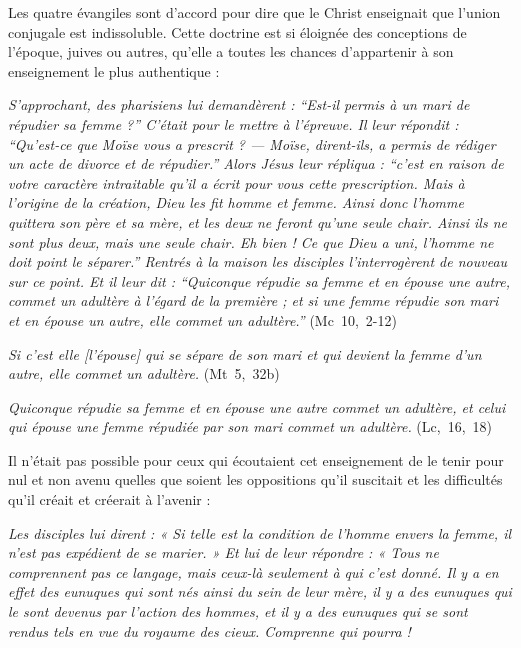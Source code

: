 Les quatre évangiles sont d'accord pour dire que le Christ enseignait que l'union conjugale est indissoluble. Cette doctrine est si éloignée des conceptions de l'époque, juives ou autres, qu'elle a toutes les chances d'appartenir à son enseignement le plus authentique :

\begin{displayquote}
\emph{S'approchant, des pharisiens lui demandèrent : \enquote{Est-il permis à un mari de répudier sa femme ?} C'était pour le mettre à l'épreuve. Il leur répondit : \enquote{Qu'est-ce que Moïse vous a prescrit ? --- Moïse, dirent-ils, a permis de rédiger un acte de divorce et de répudier.} Alors Jésus leur répliqua : \enquote{c'est en raison de votre caractère intraitable qu'il a écrit pour vous cette prescription. Mais à l'origine de la création, Dieu les fit homme et femme. Ainsi donc l'homme quittera son père et sa mère, et les deux ne feront qu'une seule chair. Ainsi ils ne sont plus deux, mais une seule chair. Eh bien ! Ce que Dieu a uni, l'homme ne doit point le séparer.} Rentrés à la maison les disciples l'interrogèrent de nouveau sur ce point. Et il leur dit : \enquote{Quiconque répudie sa femme et en épouse une autre, commet un adultère à l'égard de la première ; et si une femme répudie son mari et en épouse un autre, elle commet un adultère.}} (Mc~10,~2-12)

{\emph{Si c'est elle \emph{[l'épouse]} qui se sépare de son mari et qui devient la femme d'un autre, elle commet un adultère.}} (Mt~5,~32b)

{\emph{Quiconque répudie sa femme et en épouse une autre commet un adultère, et celui qui épouse une femme répudiée par son mari commet un adultère.}} (Lc,~16,~18)
 \end{displayquote} 

  Il n'était pas possible pour ceux qui écoutaient cet enseignement de le tenir pour nul et non avenu quelles que soient les oppositions qu'il suscitait et les difficultés qu'il créait et créerait à l'avenir :

\begin{displayquote}[Mt~19,~10-12]
\emph{Les disciples lui dirent : « Si telle est la condition de l'homme envers la femme, il n'est pas expédient de se marier. » Et lui de leur répondre : « Tous ne comprennent pas ce langage, mais ceux-là seulement à qui c'est donné. Il y a en effet des eunuques qui sont nés ainsi du sein de leur mère, il y a des eunuques qui le sont devenus par l'action des hommes, et il y a des eunuques qui se sont rendus tels en vue du royaume des cieux. Comprenne qui pourra !}
\end{displayquote}
 

